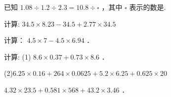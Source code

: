 \begin{example}
	\begin{problems}
		已知 $1.08 \div 1.2 \div 2.3=10.8 \div \square$ ，其中 $\square$ 表示的数是\tk.
	\end{problems} 
	
	\begin{Ssol}
		\vspace{\solfourproblems}
	\end{Ssol}
\end{example}





\begin{example}
	\begin{problems}
		计算: $34.5 \times 8.23-34.5+2.77 \times 34.5$
	\end{problems} 
	
	\begin{Ssol}
		\vspace{\solfourproblems}
	\end{Ssol}
\end{example}


\begin{lianxi}
	\begin{problems}
		计算： $4.5 \times 7-4.5 \times 6.94$ ．
	\end{problems} 
	
	\begin{lxMsol}
		\vspace{\solthreeproblems}
	\end{lxMsol}
\end{lianxi}



\begin{example}
计算: (1) $8.6 \times 0.37+0.73 \times 8.6$ ．

 (2)$6.25 \times 0.16+264 \times 0.0625+5.2 \times 6.25+0.625 \times 20$    
	\begin{Ssol}
		\vspace{\solfourproblems}
	\end{Ssol}
\end{example}

\begin{lianxi}
	\begin{problems}
		 $4.32 \times 23.5+0.581 \times 568+43.2 \times 3.46$ ．
	\end{problems} 
	
	\begin{lxMsol}
		\vspace{\solthreeproblems}
	\end{lxMsol}
\end{lianxi}


